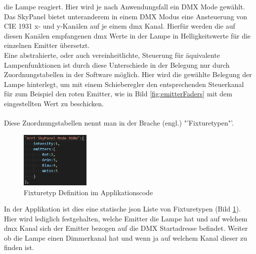 \documentclass[11pt]{scrartcl}
\begin{document}
die Lampe reagiert. Hier wird je nach Anwendungsfall ein DMX Mode gewählt. Das SkyPanel bietet unteranderem in einem DMX Modus eine Ansteuerung von CIE 1931 x- und
y-Kanälen auf je einem \ac{dmx} Kanal. Hierfür werden die auf diesen Kanälen empfangenen \ac{dmx} Werte in der Lampe in Helligkeitswerte für die einzelnen Emitter
übersetzt.\\
Eine abstrahierte, oder auch vereinheitlichte, Steuerung für äquivalente Lampenfunktionen ist durch diese Unterschiede in der Belegung nur durch
Zuordnungstabellen in der Software möglich. Hier wird die gewählte Belegung der Lampe hinterlegt, um mit einem Schieberegler den entsprechenden Steuerkanal für
zum Beispiel den roten Emitter, wie in Bild \ref{fig:emitterFaders} mit dem eingestellten Wert zu beschicken.\\
\\
Diese Zuordnungstabellen nennt man in der Brache (engl.) "'Fixturetypen"'.
\clearpage
\begin{figure}
    \vspace{-25pt}
    \begin{center}
        \includegraphics[width=0.3\textwidth]{images/code_fixturetype_skypanel.png}
    \end{center}
    \vspace{-20pt}
    \caption{Fixturetyp Definition im Applikationscode} \label{fig:code_fixturetype}
    \vspace{-15pt}
\end{figure}
\noindent
In der Applikation ist dies eine statische \ac{json} Liste von Fixturetypen (Bild \ref{fig:code_fixturetype}). Hier wird lediglich festgehalten, welche
Emitter die Lampe hat und auf welchem \ac{dmx} Kanal sich der Emitter bezogen auf die DMX Startadresse befindet. Weiter ob die Lampe einen Dimmerkanal hat und
wenn ja auf welchem Kanal dieser zu finden ist.
\end{document}

